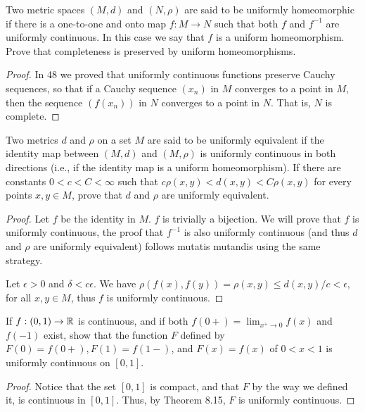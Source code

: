 \begin{exercise}{61}
Two metric spaces $(M,d)$ and $(N,\rho)$ are said to be uniformly homeomorphic if there is a one-to-one and onto map $f:M\to N$ such that both $f$ and $f^{-1}$ are uniformly continuous.
In this case we say that $f$ is a uniform homeomorphism.
Prove that completeness is preserved by uniform homeomorphisms.
\end{exercise}
\begin{proof}
In 48 we proved that uniformly continuous functions preserve Cauchy sequences, so that if a Cauchy sequence $(x_n)$ in $M$ converges to a point in $M$, then the sequence $(f(x_n))$ in $N$ converges to a point in $N$.
That is, $N$ is complete.
\end{proof} 

\begin{exercise}{62}
Two metrics $d$ and $\rho$ on a set $M$ are said to be uniformly equivalent if the identity map between $(M,d)$ and $(M,\rho)$ is uniformly continuous in both directions (i.e., if the identity map is a uniform homeomorphism).
If there are constants $0<c<C<\infty$ such that $c\rho(x,y)<d(x,y)<C\rho(x,y)$ for every points $x, y\in M$, prove that $d$ and $\rho$ are uniformly equivalent.
\end{exercise}
\begin{proof}
Let $f$ be the identity in $M$.
$f$ is trivially a bijection. 
We will prove that $f$ is uniformly continuous, the proof that $f^{-1}$ is also uniformly continuous (and thus $d$ and $\rho$ are uniformly equivalent) follows mutatis mutandis using the same strategy.

Let $\epsilon>0$ and $\delta<c\epsilon$.
We have $\rho(f(x),f(y)) = \rho(x,y) \leq d(x,y)/c < \epsilon$, for all $x,y\in M$, thus $f$ is uniformly continuous.
\end{proof} 

\begin{exercise}{65}
If $f:(0,1)\to\mathbb{R}$ is continuous, and if both $f(0+)=\lim_{x^+\to 0}f(x)$ and $f(-1)$ exist, show that the function $F$ defined by $F(0)=f(0+), F(1)=f(1-)$, and $F(x)=f(x)$ of $0<x<1$ is uniformly continuous on $[0,1]$.
\end{exercise}
\begin{proof}
Notice that the set $[0,1]$ is compact, and that $F$ by the way we defined it, is continuous in $[0,1]$.
Thus, by Theorem 8.15, $F$ is uniformly continuous.
\end{proof} 

